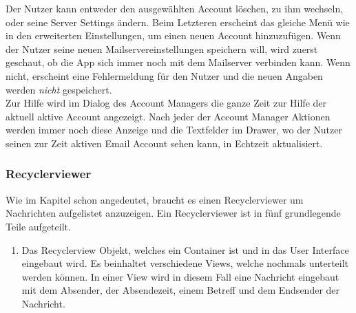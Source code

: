 \documentclass[a4paper,11pt]{article}
\begin{document}
\begin{figure}[H]
\end{figure}

Der Nutzer kann entweder den ausgewählten Account löschen, zu ihm wechseln, oder seine Server Settings ändern. Beim Letzteren erscheint das gleiche Menü wie in den erweiterten Einstellungen, um einen neuen Account hinzuzufügen. Wenn der Nutzer seine neuen Mailservereinstellungen speichern will, wird zuerst geschaut, ob die App sich immer noch mit dem Mailserver verbinden kann. Wenn nicht, erscheint eine Fehlermeldung für den Nutzer und die neuen Angaben werden \textit{nicht} gespeichert.\\

Zur Hilfe wird im Dialog des Account Managers die ganze Zeit zur Hilfe der aktuell aktive Account angezeigt. Nach jeder der Account Manager Aktionen werden immer noch diese Anzeige und die Textfelder im Drawer, wo der Nutzer seinen zur Zeit aktiven Email Account sehen kann, in Echtzeit aktualisiert.


\subsubsection{Recyclerviewer}
Wie im Kapitel  schon angedeutet, braucht es einen Recyclerviewer um Nachrichten aufgelistet anzuzeigen.
Ein Recyclerviewer ist in fünf grundlegende Teile aufgeteilt. 

\begin{enumerate}

    \item Das Recyclerview Objekt, welches ein Container ist und in das User Interface eingebaut wird. 
Es beinhaltet verschiedene Views, welche nochmals unterteilt werden können. In einer View wird in diesem 
Fall eine Nachricht eingebaut mit dem Absender, der Absendezeit, einem Betreff und dem Endsender der Nachricht. 

\end{enumerate}
\end{document}

